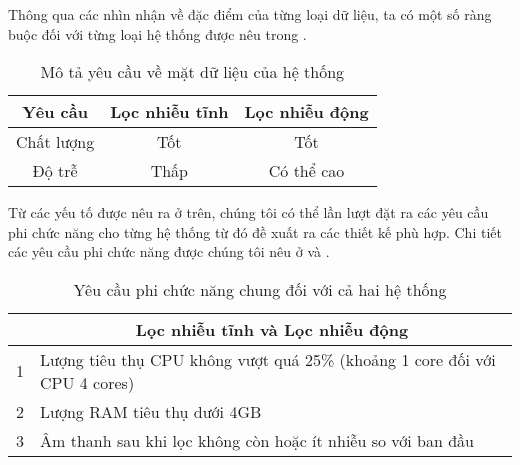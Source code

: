 		Thông qua các nhìn nhận về đặc điểm của từng loại dữ liệu, ta có một số ràng buộc đối với từng loại hệ thống được nêu trong .
		
			\begin{table}[h]
				\centering
				\begin{tabular}{c c c}
					\hline
					\textbf{Yêu cầu}	& \textbf{Lọc nhiễu tĩnh}	& \textbf{Lọc nhiễu động} \\
					\hline
					Chất lượng			& Tốt						& Tốt \\
					Độ trễ				& Thấp						& Có thể cao \\
					\hline
				\end{tabular}
				\caption{Mô tả yêu cầu về mặt dữ liệu của hệ thống}
				\label{design::sys_data_req}
			\end{table}
		
		
		Từ các yếu tố được nêu ra ở trên, chúng tôi có thể lần lượt đặt ra các yêu cầu phi chức năng cho từng hệ thống từ đó đề xuất ra các thiết kế phù hợp. Chi tiết các yêu cầu phi chức năng được chúng tôi nêu ở  và .
		
			\begin{table}[h]
				\centering
				\begin{tabular}{c p{120mm}}
					\hline
					& \multicolumn{1}{c}{\textbf{Lọc nhiễu tĩnh và Lọc nhiễu động}} \\
					\hline
					1	& Lượng tiêu thụ CPU không vượt quá 25\% (khoảng 1 core đối với CPU 4 cores) \\
					2	& Lượng RAM tiêu thụ dưới 4GB \\
					3	& Âm thanh sau khi lọc không còn hoặc ít nhiễu so với ban đầu \\
					\hline
				\end{tabular}
				\caption{Yêu cầu phi chức năng chung đối với cả hai hệ thống}
				\label{design::non_functional_req_shared}
			\end{table}
		
